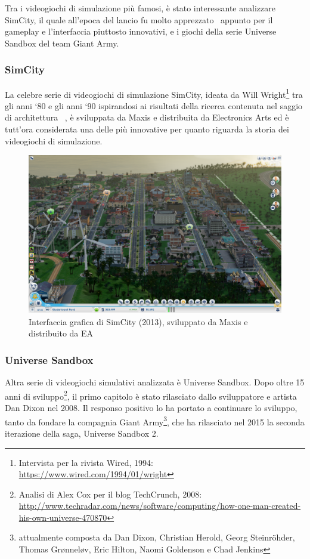             Tra i videogiochi di simulazione più famosi, è stato interessante analizzare SimCity, il quale all'epoca del lancio fu molto apprezzato~\cite{friedman1995} appunto per il gameplay e l'interfaccia piuttosto innovativi, e i giochi della serie Universe Sandbox del team Giant Army.

            \subsubsection{SimCity}\label{subsubsec:simcity}
                La celebre serie di videogiochi di simulazione SimCity, ideata da Will Wright\footnote{Intervista per la rivista Wired, 1994:
                \url{https://www.wired.com/1994/01/wright}} tra gli anni `80 e gli anni `90 ispirandosi ai risultati della ricerca contenuta nel saggio di architettura ~\cite{aPatternLanguage}, è sviluppata da Maxis e distribuita da Electronics Arts ed è tutt'ora considerata una delle più innovative per quanto riguarda la storia dei videogiochi di simulazione.

                \begin{figure}[htbp]
                    \centering
                    \includegraphics[scale=0.24]{img/SimCity}
                    \caption{Interfaccia grafica di SimCity (2013), sviluppato da Maxis e distribuito da EA}
                    \label{fig:simcity}
                \end{figure}

            \subsubsection{Universe Sandbox}\label{subsubsec:universesandbox}
                Altra serie di videogiochi simulativi analizzata è Universe Sandbox.
                Dopo oltre 15 anni di sviluppo\footnote{Analisi di Alex Cox per il blog TechCrunch, 2008:
                \url{http://www.techradar.com/news/software/computing/how-one-man-created-his-own-universe-470870}}, il primo capitolo è stato rilasciato dallo sviluppatore e artista Dan Dixon nel 2008.
                Il responso positivo lo ha portato a continuare lo sviluppo, tanto da fondare la compagnia Giant Army\footnote{attualmente composta da Dan Dixon, Christian Herold, Georg Steinröhder, Thomas Grønneløv, Eric Hilton, Naomi Goldenson e Chad Jenkins}, che ha rilasciato nel 2015 la seconda iterazione della saga, Universe Sandbox 2.

